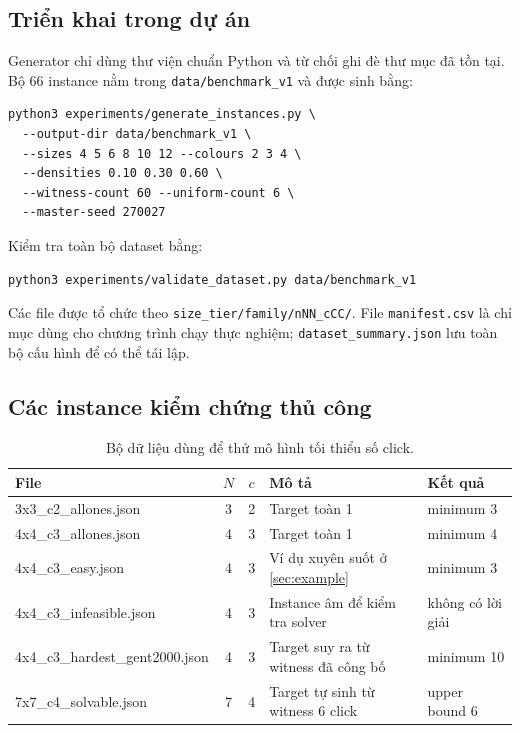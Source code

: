 \documentclass[11pt,a4paper]{article}
\begin{document}
\subsection{Triển khai trong dự án}

Generator chỉ dùng thư viện chuẩn Python và từ chối ghi đè thư mục đã tồn
tại. Bộ 66 instance nằm trong \texttt{data/benchmark\_v1} và được sinh bằng:

\begin{lstlisting}[style=jsonstyle,language={}]
python3 experiments/generate_instances.py \
  --output-dir data/benchmark_v1 \
  --sizes 4 5 6 8 10 12 --colours 2 3 4 \
  --densities 0.10 0.30 0.60 \
  --witness-count 60 --uniform-count 6 \
  --master-seed 270027
\end{lstlisting}

Kiểm tra toàn bộ dataset bằng:

\begin{lstlisting}[style=jsonstyle,language={}]
python3 experiments/validate_dataset.py data/benchmark_v1
\end{lstlisting}

Các file được tổ chức theo
\texttt{size\_tier/family/nNN\_cCC/}. File \texttt{manifest.csv} là chỉ mục dùng
cho chương trình chạy thực nghiệm; \texttt{dataset\_summary.json} lưu toàn
bộ cấu hình để có thể tái lập.

\subsection{Các instance kiểm chứng thủ công}

\begin{table}[H]
\centering
\caption{Bộ dữ liệu dùng để thử mô hình tối thiểu số click.}
\label{tab:dataset}
\footnotesize
\begin{tabularx}{\textwidth}{@{}>{\ttfamily}l c c X l@{}}
\toprule
\normalfont\textbf{File} & $N$ & $c$ &
\normalfont\textbf{Mô tả} & \normalfont\textbf{Kết quả} \\
\midrule
3x3\_c2\_allones.json
&3&2&Target toàn 1&minimum 3\\
4x4\_c3\_allones.json
&4&3&Target toàn 1&minimum 4\\
4x4\_c3\_easy.json
&4&3&Ví dụ xuyên suốt ở \cref{sec:example}&minimum 3\\
4x4\_c3\_infeasible.json
&4&3&Instance âm để kiểm tra solver&không có lời giải\\
4x4\_c3\_hardest\_gent2000.json
&4&3&Target suy ra từ witness đã công bố&minimum 10
\cite{gent2000symmetry}\\
7x7\_c4\_solvable.json
&7&4&Target tự sinh từ witness 6 click&upper bound 6\\
\bottomrule
\end{tabularx}
\end{table}
\end{document}
